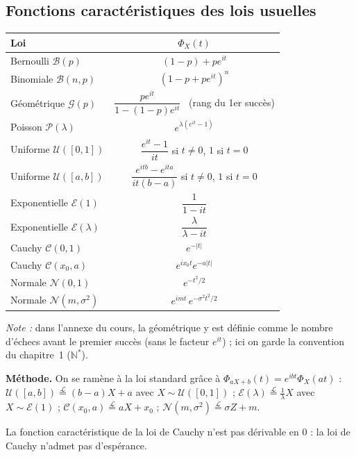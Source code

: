 \documentclass[11pt,a4paper]{article}
\newcommand{\N}{\mathbb{N}}
\newcommand{\loi}{\overset{\mathcal L}{=}}
\begin{document}
\subsection{Fonctions caractéristiques des lois usuelles}
\begin{center}
\renewcommand{\arraystretch}{1.6}
\begin{tabular}{@{}lc@{}}
\toprule
Loi & $\Phi_X(t)$\\
\midrule
Bernoulli $\mathcal B(p)$ & $(1-p)+pe^{it}$\\
Binomiale $\mathcal B(n,p)$ & $(1-p+pe^{it})^n$\\
Géométrique $\mathcal G(p)$ & $\dfrac{pe^{it}}{1-(1-p)e^{it}}$ \ (rang du 1er succès)\\
Poisson $\mathcal P(\lambda)$ & $e^{\lambda(e^{it}-1)}$\\
Uniforme $\mathcal U([0,1])$ & $\dfrac{e^{it}-1}{it}$ si $t\ne0$, $1$ si $t=0$\\
Uniforme $\mathcal U([a,b])$ & $\dfrac{e^{itb}-e^{ita}}{it(b-a)}$ si $t\ne0$, $1$ si $t=0$\\
Exponentielle $\mathcal E(1)$ & $\dfrac{1}{1-it}$\\
Exponentielle $\mathcal E(\lambda)$ & $\dfrac{\lambda}{\lambda-it}$\\
Cauchy $\mathcal C(0,1)$ & $e^{-|t|}$\\
Cauchy $\mathcal C(x_0,a)$ & $e^{ix_0t}e^{-a|t|}$\\
Normale $\mathcal N(0,1)$ & $e^{-t^2/2}$\\
Normale $\mathcal N(m,\sigma^2)$ & $e^{imt}\,e^{-\sigma^2t^2/2}$\\
\bottomrule
\end{tabular}
\end{center}
\emph{Note :} dans l'annexe du cours, la géométrique y est définie comme le nombre d'échecs avant le premier succès (sans le facteur $e^{it}$) ; ici on garde la convention du chapitre~1 ($\N^*$).

\textbf{Méthode.} On se ramène à la loi standard grâce à $\Phi_{aX+b}(t)=e^{ibt}\Phi_X(at)$ :
$\mathcal U([a,b])\loi(b-a)X+a$ avec $X\sim\mathcal U([0,1])$ ; $\mathcal E(\lambda)\loi\frac1\lambda X$ avec $X\sim\mathcal E(1)$ ; $\mathcal C(x_0,a)\loi aX+x_0$ ; $\mathcal N(m,\sigma^2)\loi\sigma Z+m$.

\begin{rem}
La fonction caractéristique de la loi de Cauchy n'est pas dérivable en $0$ : la loi de Cauchy n'admet pas d'espérance.
\end{rem}
\end{document}
